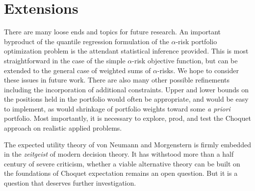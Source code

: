 \documentclass{birkart}
\theoremstyle{definition}
\theoremstyle{remark}
\numberwithin{equation}{section}
\begin{document}
\section{Extensions}
There are many loose ends and topics for future research.  An important
byproduct of the quantile regression formulation of the $\alpha$-risk
portfolio optimization problem is the attendant statistical inference
provided.  This is most straightforward in the case of the simple
$\alpha$-risk objective function, but can be extended to the general
case of weighted sums of $\alpha$-risks.  We hope to consider these
issues in future work.  There are also many other possible refinements
including the incorporation of additional constraints.  Upper and lower
bounds on the positions held in the portfolio would often be
appropriate, and would be easy to implement, as would shrinkage
of portfolio weights toward some {\it a priori } portfolio.  Most
importantly, it is necessary to explore, prod, and test the Choquet
approach on realistic applied problems.

The expected utility theory of von Neumann and Morgenstern is firmly
embedded in the {\it zeitgeist} of modern decision theory.  It has
withstood more than a half century of severe criticism, whether 
a viable alternative theory can be built on the foundations of Choquet
expectation remains an open question.  But it is a question that
deserves further investigation.


\end{document}
